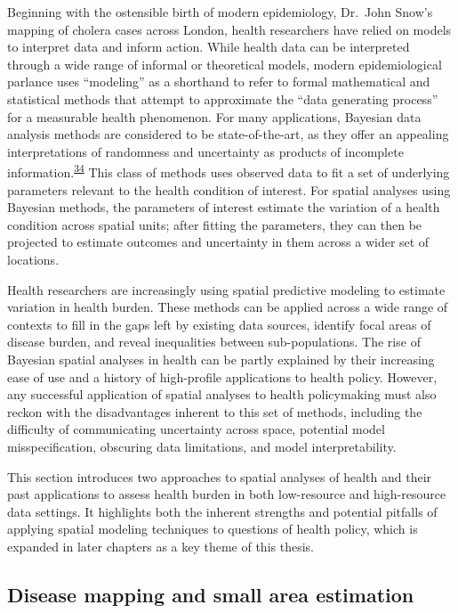 \documentclass[
]{article}
\begin{document}
Beginning with the ostensible birth of modern epidemiology, Dr.~John Snow's mapping of cholera cases across London, health researchers have relied on models to interpret data and inform action. While health data can be interpreted through a wide range of informal or theoretical models, modern epidemiological parlance uses ``modeling'' as a shorthand to refer to formal mathematical and statistical methods that attempt to approximate the ``data generating process'' for a measurable health phenomenon. For many applications, Bayesian data analysis methods are considered to be state-of-the-art, as they offer an appealing interpretations of randomness and uncertainty as products of incomplete information.\textsuperscript{\protect\hyperlink{ref-McElreath2016}{34}} This class of methods uses observed data to fit a set of underlying parameters relevant to the health condition of interest. For spatial analyses using Bayesian methods, the parameters of interest estimate the variation of a health condition across spatial units; after fitting the parameters, they can then be projected to estimate outcomes and uncertainty in them across a wider set of locations.

Health researchers are increasingly using spatial predictive modeling to estimate variation in health burden. These methods can be applied across a wide range of contexts to fill in the gaps left by existing data sources, identify focal areas of disease burden, and reveal inequalities between sub-populations. The rise of Bayesian spatial analyses in health can be partly explained by their increasing ease of use and a history of high-profile applications to health policy. However, any successful application of spatial analyses to health policymaking must also reckon with the disadvantages inherent to this set of methods, including the difficulty of communicating uncertainty across space, potential model misspecification, obscuring data limitations, and model interpretability.

This section introduces two approaches to spatial analyses of health and their past applications to assess health burden in both low-resource and high-resource data settings. It highlights both the inherent strengths and potential pitfalls of applying spatial modeling techniques to questions of health policy, which is expanded in later chapters as a key theme of this thesis.

\hypertarget{disease-mapping-and-small-area-estimation}{%
\subsection{Disease mapping and small area estimation}\label{disease-mapping-and-small-area-estimation}}
\end{document}
